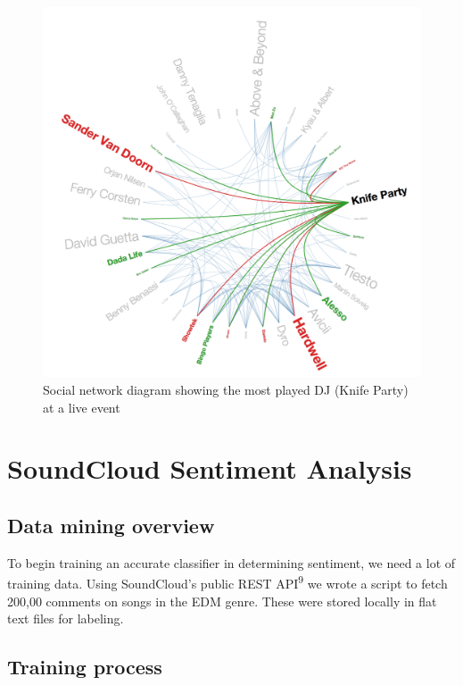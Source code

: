 \documentclass[12pt]{dalcsthesis}
\begin{document}
\begin{figure}[h]
\includegraphics[scale=.5]{knife_party}
\centering
\caption{Social network diagram showing the most played DJ (Knife Party) at a live event }
\end{figure}

\chapter{SoundCloud Sentiment Analysis}

\section{Data mining overview}

To begin training an accurate classifier in determining sentiment, we need a lot of training data. Using SoundCloud's public REST API\textsuperscript{9} we wrote a script to fetch 200,00 comments on songs in the EDM genre. These were stored locally in flat text files for labeling.

\section{Training process}
\end{document}
